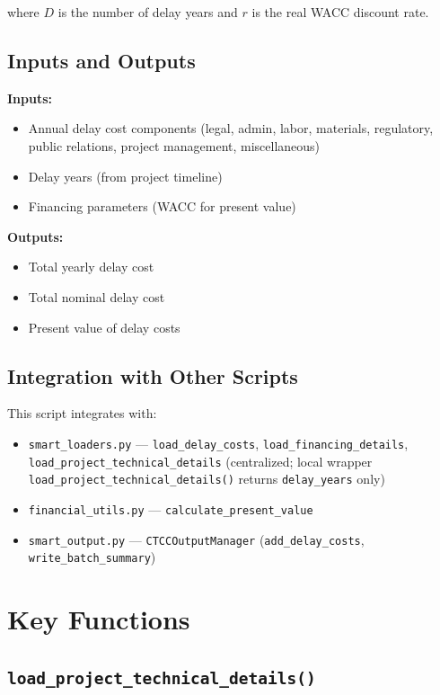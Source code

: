 \documentclass[ctcc_full_documentation.tex]{subfiles}
\begin{document}
where $D$ is the number of delay years and $r$ is the real WACC discount rate.

\subsection{Inputs and Outputs}

\textbf{Inputs:}
\begin{itemize}
    \item Annual delay cost components (legal, admin, labor, materials, regulatory, public relations, project management, miscellaneous)
    \item Delay years (from project timeline)
    \item Financing parameters (WACC for present value)
\end{itemize}

\textbf{Outputs:}
\begin{itemize}
    \item Total yearly delay cost
    \item Total nominal delay cost
    \item Present value of delay costs
\end{itemize}

\subsection{Integration with Other Scripts}

This script integrates with:
\begin{itemize}
    \item \texttt{smart\_loaders.py} --- \texttt{load\_delay\_costs}, \texttt{load\_financing\_details}, \texttt{load\_project\_technical\_details} (centralized; local wrapper \texttt{load\_project\_technical\_details()} returns \texttt{delay\_years} only)
    \item \texttt{financial\_utils.py} --- \texttt{calculate\_present\_value}
    \item \texttt{smart\_output.py} --- \texttt{CTCCOutputManager} (\texttt{add\_delay\_costs}, \texttt{write\_batch\_summary})
\end{itemize}

\section{Key Functions}

\subsection{\texttt{load\_project\_technical\_details()}}
\end{document}
